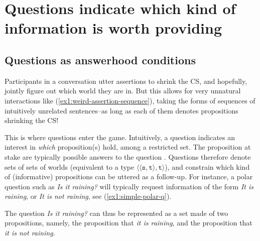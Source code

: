 \section{Questions indicate which kind of information is worth providing}\label{sec:questions}

\subsection{Questions as answerhood conditions}
Participants in a conversation utter assertions to shrink the CS, and hopefully, jointly figure out which world they are in. But this allows for very unnatural interactions like (\ref{ex1:weird-assertion-sequence}), taking the forms of sequences of intuitively unrelated sentences--as long as each of them denotes propositions shrinking the CS!

\begin{exe}
	\label{ex1:weird-assertion-sequence}
\end{exe}

This is where questions enter the game. Intuitively, a question indicates an interest in \textit{which} proposition(s) hold, among a restricted set. The proposition at stake are typically possible answers to the question \cite{Hamblin1973,Dayal1996}. Questions therefore denote sets of sets of worlds (equivalent to a type $\langle\langle \texttt{s}, \texttt{t}\rangle, \texttt{t}\rangle$), and constrain which kind of (informative) propositions can be uttered as a follow-up. For instance, a polar question such as \textit{Is it raining?} will typically request information of the form \textit{It is raining}, or \textit{It is not raining}, see (\ref{ex1:simple-polar-q}). 

\begin{exe}
	\label{ex1:simple-polar-q}
\end{exe} 

The question \textit{Is it raining?} can thus be represented as a set made of two propositions, namely, the proposition that \textit{it is raining}, and the proposition that \textit{it is not raining}.  

\begin{exe}
\end{exe}

